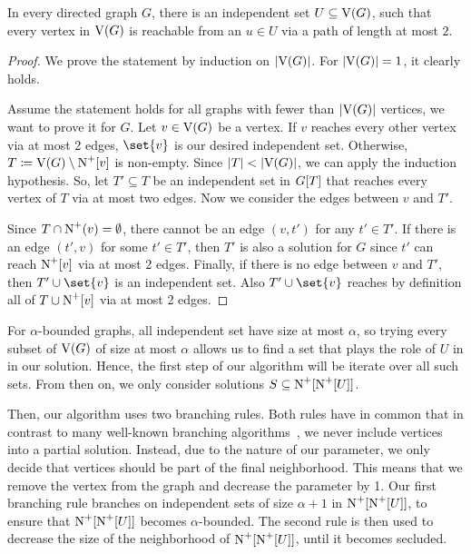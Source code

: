 \iflong
\begin{lemma}
\else
\begin{lemma}[$\star$]
\fi
\label{lem:ind_set_reaches}
  In every directed graph $G$, there is an independent set $U \subseteq \operatorname{V}({G})$, such that every vertex in $\operatorname{V}({G})$ is reachable from an $u \in U$ via a path of length at most $2$.
\end{lemma}
\iflong
\begin{proof}
  We prove the statement by induction on $\abs{\ve{G}}$. For $\abs{\ve{G}}=1$, it clearly holds.

  Assume the statement holds for all graphs with fewer than $\abs{\ve{G}}$ vertices, we want to prove it for $G$.
  Let $v \in \operatorname{V}({G})$ be a vertex. If $v$ reaches every other vertex via at most 2 edges, $\set{v}$ is our desired independent set. Otherwise, $T \coloneqq \operatorname{V}({G}) \setminus \operatorname{\operatorname{N}^+}[{v}]$ is non-empty. Since $\abs{T} < \abs{\ve{G}}$, we can apply the induction hypothesis. So, let $T' \subseteq T$ be an independent set in ${G}[{T}]$ that reaches every vertex of $T$ via at most two edges. Now we consider the edges between $v$ and $T'$. 

  Since $T \cap \operatorname{\operatorname{N}^+}({v}) = \emptyset$, there cannot be an edge $(v,t')$ for any $t' \in T'$. If there is an edge $(t', v)$ for some $t' \in T'$, then $T'$ is also a solution for $G$ since $t'$ can reach $\operatorname{\operatorname{N}^+}[{v}]$ via at most 2 edges.
  Finally, if there is no edge between $v$ and $T'$, then $T' \cup \set{v}$ is an independent set. Also $T' \cup \set{v}$ reaches by definition all of $T \cup \operatorname{\operatorname{N}^+}[{v}]$ via at most 2 edges.
\end{proof}
\fi

For $\alpha$-bounded graphs, all independent set have size at most $\alpha$, so trying every subset of $\operatorname{V}({G})$ of size at most $\alpha$ allows us to find a set that plays the role of $U$ in  in our solution. Hence, the first step of our algorithm will be iterate over all such sets. From then on, we only consider solutions $S \subseteq \operatorname{\operatorname{N}^+}[{\operatorname{\operatorname{N}^+}[{U}]}]$.

Then, our algorithm uses two branching rules. Both rules have in common that in contrast to many well-known branching algorithms~\cite[Chapter~3]{cygan2015parameterized}, we never include vertices into a partial solution. Instead, due to the nature of our parameter, we only decide that vertices should be part of the final neighborhood. This means that we remove the vertex from the graph and decrease the parameter by 1.
Our first branching rule branches on independent sets of size $\alpha + 1$ in $\operatorname{\operatorname{N}^+}[{\operatorname{\operatorname{N}^+}[{U}]}]$, to ensure that $\operatorname{\operatorname{N}^+}[{\operatorname{\operatorname{N}^+}[{U}]}]$ becomes $\alpha$-bounded. The second rule is then used to decrease the size of the neighborhood of $\operatorname{\operatorname{N}^+}[{\operatorname{\operatorname{N}^+}[{U}]}]$, until it becomes secluded.


\end{lemma}
